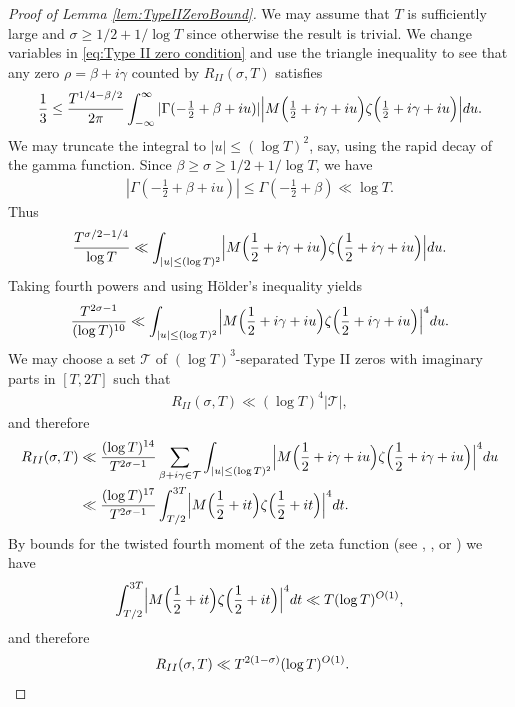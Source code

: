 \documentclass[12pt]{amsart}
\theoremstyle{plain}
\theoremstyle{definition}
\theoremstyle{remark}
\begin{document}
\begin{proof}[Proof of Lemma \ref{lem:TypeIIZeroBound}]
We may assume that $T$ is sufficiently large and $\sigma\ge 1/2+1/\log{T}$ since otherwise the result is trivial. We change variables in \eqref{eq:Type II zero condition} and use the triangle inequality to see that any zero $\rho=\beta+i\gamma$ counted by $R_{II}(\sigma,T)$ satisfies
\begin{align*}
\frac{1}{3}\leq \frac{T^{1/4-\beta/2}}{2\pi}\int_{-\infty}^\infty|\Gamma(-\tfrac{1}{2}+\beta+iu)|\Bigl|M\Bigl( \tfrac{1}{2}+i\gamma+iu\Bigr)\zeta\Bigl(\tfrac{1}{2}+i\gamma+iu\Bigr) \Bigr|du.
\end{align*}
We may truncate the integral to $|u|\leq (\log T)^2$, say, using the rapid decay of the gamma function. Since $\beta\ge \sigma\geq1/2+1/\log{T}$, we have
\begin{align*}
|\Gamma(-\tfrac{1}{2}+\beta+iu)| \leq \Gamma(-\tfrac{1}{2}+\beta) \ll \log T.
\end{align*}
Thus
\begin{align*}
\frac{T^{\sigma/2-1/4}}{\log T} \ll \int_{|u|\leq (\log T)^2}\Bigl|M\Bigl( \frac{1}{2}+i\gamma+iu\Bigr)\zeta\Bigl(\frac{1}{2}+i\gamma+iu\Bigr) \Bigr|du.
\end{align*}
Taking fourth powers and using H\"older's inequality yields
\begin{align*}
\frac{T^{2\sigma-1}}{(\log T)^{10}} \ll \int_{|u|\leq (\log T)^2}\Bigl|M\Bigl( \frac{1}{2}+i\gamma+iu\Bigr)\zeta\Bigl(\frac{1}{2}+i\gamma+iu\Bigr) \Bigr|^4 du.
\end{align*}
We may choose a set $\mathcal{T}$ of $(\log T)^3$-separated Type II zeros with imaginary parts in $[T,2T]$ such that
\begin{align*}
R_{II}(\sigma,T) \ll (\log T)^{4}|\mathcal{T}|,
\end{align*}
and therefore
\begin{align*}
R_{II}(\sigma,T) &\ll \frac{(\log T)^{14}}{T^{2\sigma-1}}\sum_{\beta+i\gamma \in \mathcal{T}} \int_{|u|\leq (\log T)^2}\Bigl|M\Bigl( \frac{1}{2}+i\gamma+iu\Bigr)\zeta\Bigl(\frac{1}{2}+i\gamma+iu\Bigr) \Bigr|^4 du \\
&\ll \frac{(\log T)^{17}}{T^{2\sigma-1}} \int_{T/2}^{3T} \Bigl|M\Bigl( \frac{1}{2}+it\Bigr)\zeta\Bigl(\frac{1}{2}+it\Bigr) \Bigr|^4dt.
\end{align*}
By bounds for the twisted fourth moment of the zeta function (see \cite[Theorem 1.1]{HY2010}, \cite[Theorem 1.2]{BBLR2020}, or \cite[Proposition 5.1]{HRS2019}) we have
\begin{align*}
\int_{T/2}^{3T} \Bigl|M\Bigl( \frac{1}{2}+it\Bigr)\zeta\Bigl(\frac{1}{2}+it\Bigr) \Bigr|^4dt \ll T (\log T)^{O(1)},
\end{align*}
and therefore
\begin{align*}
R_{II}(\sigma,T) &\ll T^{2(1-\sigma)} (\log T)^{O(1)}. \qedhere
\end{align*}
\end{proof}



\end{document}
